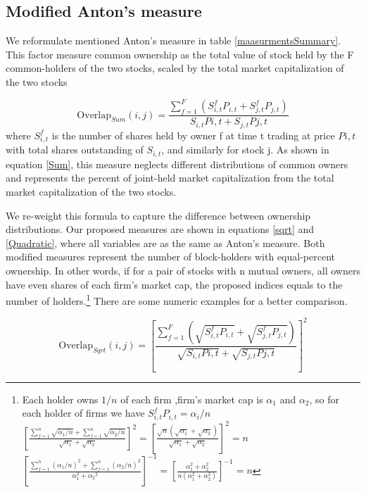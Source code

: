
\begin{appendices}
	\section{{Modified Anton's measure}}
	\label{ModifiedMeasure}
We reformulate mentioned Anton's measure in table \ref{maasurmentsSummary}. This factor measure common ownership as the total value of
stock held by the F common-holders of the two stocks, scaled by the total market capitalization of the two stocks

		\begin{equation}
			\text{Overlap}_{Sum}(i, j) = \frac{\sum_{f = 1}^{F} (S^f_{i,t}P_{i,t}+S^f_{j,t}P_{j,t})}{S_{i,t}P{i,t} + S_{j,t}P{j,t}}
			\label{Sum}
		\end{equation}
where $ S^f_{i,t}$ is the number of shares held by owner f
at time t trading at price $ P{i,t} $ with total shares outstanding of $ S_{i,t} $, and similarly for stock j. 
As shown in equation \ref{Sum}, this measure neglects different distributions of common owners and represents the percent of joint-held market capitalization from the total market capitalization of the two stocks.

We re-weight this formula to capture the difference between ownership distributions. Our proposed measures are shown in equations \ref{sqrt} and \ref{Quadratic}, where all variables are as the same as Anton's measure. Both modified measures represent the number of block-holders with equal-percent ownership. In other words, if for a pair of stocks with n mutual owners, all owners have even shares of each firm's market cap, the proposed indices equals to the number of holders.\footnote{Each holder owns $ 1/n $ of each firm ,firm's market cap is $ \alpha_1 $ and $ \alpha_2 $, so for each holder of firms we have $ S^f_{i,t}P_{i,t} = \alpha_i/n $\\
		$
		[  \frac{\sum_{f=1}^{n} \sqrt{\alpha_1/n}+\sum_{f=1}^{n} \sqrt{\alpha_2/n}}{\sqrt{\alpha_1} + \sqrt{\alpha_2}}]^2 
		= [\frac{\sqrt{n}(\sqrt{\alpha_1} +\sqrt{\alpha_2 })}{\sqrt{\alpha_1} + \sqrt{\alpha_2}}]^2 = n $
		\\
		$
		[\frac{\sum_{f=1}^{n} {(\alpha_1/n)^2}+\sum_{f=1}^{n} {(\alpha_2/n)^2}}{\alpha_1^2 +{\alpha_2}^2}]^{-1} = [\frac{{\alpha_1^2 + \alpha_2^2 }}{n(\alpha_1^2 + \alpha_2^2)}]^{-1} = n
		$} There are some numeric examples for a better comparison. 

		\begin{equation}
			\text{Overlap}_{Sqrt}(i, j) =  [\frac{\sum_{f =1}^{F}(\sqrt{S^f_{i,t}P_{i,t}}+\sqrt{S^f_{j,t}P_{j,t}})}{\sqrt{S_{i,t}P{i,t}} + \sqrt{S_{j,t}P{j,t}}}]^2 
			\label{sqrt}
		\end{equation}
		

\end{appendices}
